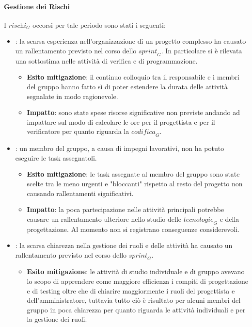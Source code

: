 \paragraph*{Gestione dei Rischi}
I $\textit{rischi}_G$ occorsi per tale periodo sono stati i seguenti:
\begin{itemize}
    \item {}: la scarsa esperienza nell'organizzazione di un progetto complesso ha causato un rallentamento previsto nel corso dello $\textit{sprint}_G$. In particolare si è rilevata una sottostima nelle attività di verifica e di programmazione.
    \begin{itemize}
        \item \textbf{Esito mitigazione}: il continuo colloquio tra il responsabile e i membri del gruppo hanno fatto sì di poter estendere la durata delle attività segnalate in modo ragionevole.
        \item \textbf{Impatto}: sono state spese risorse significative non previste andando ad impattare sul modo di calcolare le ore per il progettista e per il verificatore per quanto riguarda la $\textit{codifica}_G$.
    \end{itemize}
    \item {}: un membro del gruppo, a causa di impegni lavorativi, non ha potuto eseguire le task assegnatoli.
    \begin{itemize}
        \item \textbf{Esito mitigazione}: le task assegnate al membro del gruppo sono state scelte tra le meno urgenti e "bloccanti" rispetto al resto del progetto non causando rallentamenti significativi.
        \item \textbf{Impatto}: la poca partecipazione nelle attività principali potrebbe causare un rallentamento ulteriore nello studio delle $\textit{tecnologie}_G$ e della progettazione. Al momento non si registrano conseguenze considerevoli. 
    \end{itemize}
    \item {}: la scarsa chiarezza nella gestione dei ruoli e delle attività ha causato un rallentamento previsto nel corso dello $\textit{sprint}_G$.
    \begin{itemize}
        \item \textbf{Esito mitigazione}: le attività di studio individuale e di gruppo avevano lo scopo di apprendere come maggiore efficienza i compiti di progettazione e di testing oltre che di chiarire maggiormente i ruoli del progettista e dell'amministratore, tuttavia tutto ciò è risultato per alcuni membri del gruppo in poca chiarezza per quanto riguarda le attività individuali e per la gestione dei ruoli. 

\end{itemize}
\end{itemize}
